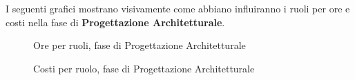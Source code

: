 I seguenti grafici mostrano visivamente come abbiano influiranno i ruoli per ore e costi nella fase di \textbf{Progettazione Architetturale}.
\begin{figure}[H]
	\centering
	\caption{Ore per ruoli, fase di Progettazione Architetturale}
\end{figure}
\begin{figure}[H]
	\centering
	\caption{Costi per ruolo, fase di Progettazione Architetturale}
\end{figure}

